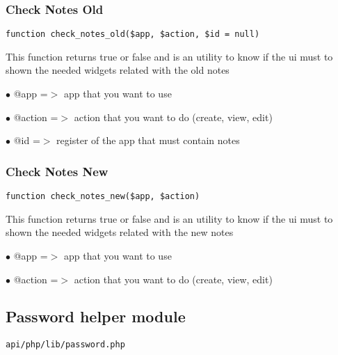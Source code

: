 \documentclass[a4paper]{article}
\begin{document}
\hypertarget{toc497}{}
\subsubsection{Check Notes Old}

\begin{lstlisting}
function check_notes_old($app, $action, $id = null)
\end{lstlisting}

This function returns true or false and is an utility to know if the ui
must to shown the needed widgets related with the old notes

\begin{compactitem}
\item[\color{myblue}$\bullet$] @app    =$>$ app that you want to use
\item[\color{myblue}$\bullet$] @action =$>$ action that you want to do (create, view, edit)
\item[\color{myblue}$\bullet$] @id     =$>$ register of the app that must contain notes
\end{compactitem}

\hypertarget{toc498}{}
\subsubsection{Check Notes New}

\begin{lstlisting}
function check_notes_new($app, $action)
\end{lstlisting}

This function returns true or false and is an utility to know if the ui
must to shown the needed widgets related with the new notes

\begin{compactitem}
\item[\color{myblue}$\bullet$] @app    =$>$ app that you want to use
\item[\color{myblue}$\bullet$] @action =$>$ action that you want to do (create, view, edit)
\end{compactitem}

\hypertarget{toc499}{}
\subsection{Password helper module}

\begin{lstlisting}
api/php/lib/password.php
\end{lstlisting}
\end{document}
